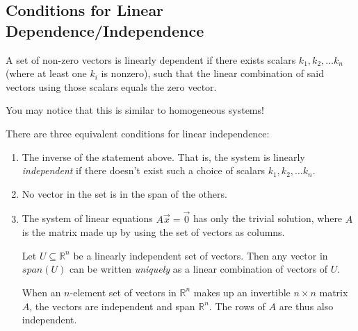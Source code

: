 \documentclass[11pt]{exam}
\begin{document}
    \vspace{20px}
    \subsection{Conditions for Linear Dependence/Independence}
    A set of non-zero vectors is linearly dependent if there exists scalars $k_1, k_2, \dots k_n$ (where at least one $k_i$ is nonzero),
    such that the linear combination of said vectors using those scalars equals the zero vector.

    You may notice that this is similar to homogeneous systems!

    There are three equivalent conditions for linear independence:
    \begin{enumerate}
        \item The inverse of the statement above. That is, the system is linearly \textit{independent} if there doesn't exist such a choice
        of scalars $k_1, k_2, \dots k_n$.
        \item No vector in the set is in the span of the others.
        \item The system of linear equations $A \vec{x} = \vec{0}$ has only the trivial solution, where $A$ is the matrix made up by using
        the set of vectors as columns.


        \vspace{20px}
        Let $U \subseteq \mathbb{R}^n$ be a linearly independent set of vectors. Then any vector in $span(U)$ can be written
        \textit{uniquely} as a linear combination of vectors of $U$.

        \vspace{20px}
        When an $n$-element set of vectors in $\mathbb{R}^n$ makes up an invertible $n \times n$ matrix $A$, the vectors are independent and
        span $\mathbb{R}^n$. The rows of $A$ are thus also independent.

    \end{enumerate}
\end{document}
